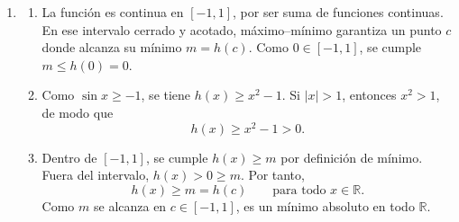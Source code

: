 \documentclass[10pt,a5paper]{article}
\begin{document}
\begin{solucion}
\begin{enumerate}
  \item
  \begin{enumerate}
    \item La función es continua en $[-1,1]$, por ser suma de funciones continuas. En ese intervalo cerrado y acotado, máximo--mínimo garantiza un punto $c$ donde alcanza su mínimo $m=h(c)$. Como $0\in[-1,1]$, se cumple $m\leq h(0)=0$.
    \item Como $\sin x\geq-1$, se tiene $h(x)\geq x^2-1$. Si $|x|>1$, entonces $x^2>1$, de modo que
    \[
      h(x)\geq x^2-1>0.
    \]
    \item Dentro de $[-1,1]$, se cumple $h(x)\geq m$ por definición de mínimo. Fuera del intervalo, $h(x)>0\geq m$. Por tanto,
    \[
      h(x)\geq m=h(c)\qquad\text{para todo }x\in\mathbb{R}.
    \]
    Como $m$ se alcanza en $c\in[-1,1]$, es un mínimo absoluto en todo $\mathbb{R}$.
  \end{enumerate}
\end{enumerate}

\end{solucion}
\fi
\end{document}
